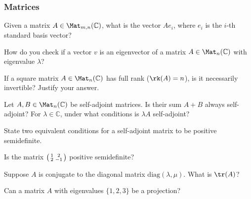 \documentclass[a4paper,oneside, 12pt]{amsart}
\begin{document}
\subsubsection*{Matrices}
\begin{thmlist}
  \item Given a matrix \(A \in \Mat_{m,n}(\mathbb{C})\), what is the vector \(Ae_i\), where \(e_i\) is the \(i\)-th standard basis vector?
  \item How do you check if a vector \(v\) is an eigenvector of a matrix \(A \in \Mat_{n}( \mathbb{C})\) with eigenvalue \(\lambda\)?
  \item If a square matrix \(A \in \Mat_n(\mathbb{C})\) has full rank (\(\rk(A) = n\)), is it necessarily invertible? Justify your answer.
  \item Let \(A, B \in \Mat_{n}( \mathbb{C})\) be self-adjoint matrices.
  Is their sum \(A+B\) always self-adjoint?
  For \(\lambda \in \mathbb{C}\), under what conditions is \(\lambda A\) self-adjoint?
  \item State two equivalent conditions for a self-adjoint matrix to be positive semidefinite.
  \item Is the matrix \(\begin{psmallmatrix} 1 & 2 \\ 2 & -1 \end{psmallmatrix}\) positive semidefinite?
  \item Suppose \(A\) is conjugate to the diagonal matrix \(\mathrm{diag}(\lambda, \mu)\). What is \(\tr(A)\)?
  \item Can a matrix \(A\) with eigenvalues \(\{1, 2, 3\}\) be a projection?
\end{thmlist}
\end{document}
